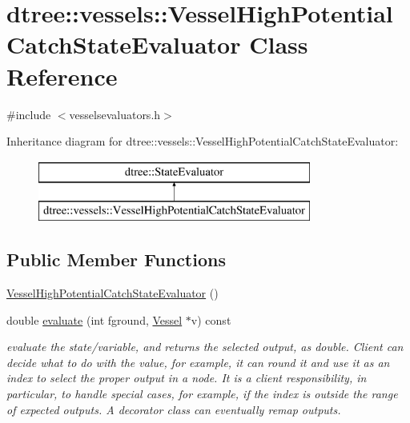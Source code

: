 \hypertarget{classdtree_1_1vessels_1_1_vessel_high_potential_catch_state_evaluator}{}\section{dtree\+::vessels\+::Vessel\+High\+Potential\+Catch\+State\+Evaluator Class Reference}
\label{classdtree_1_1vessels_1_1_vessel_high_potential_catch_state_evaluator}


{\ttfamily \#include $<$vesselsevaluators.\+h$>$}

Inheritance diagram for dtree\+::vessels\+::Vessel\+High\+Potential\+Catch\+State\+Evaluator\+:\begin{figure}[H]
\begin{center}
\leavevmode
\includegraphics[height=2.000000cm]{da/d41/classdtree_1_1vessels_1_1_vessel_high_potential_catch_state_evaluator}
\end{center}
\end{figure}
\subsection*{Public Member Functions}
\begin{DoxyCompactItemize}
\item 
\mbox{\hyperlink{classdtree_1_1vessels_1_1_vessel_high_potential_catch_state_evaluator_a78dd966f4bee0f041b0f927630e7bde7}{Vessel\+High\+Potential\+Catch\+State\+Evaluator}} ()
\item 
double \mbox{\hyperlink{classdtree_1_1vessels_1_1_vessel_high_potential_catch_state_evaluator_ad5031e7bb7fc276bd5ab0aa3965b7fb9}{evaluate}} (int fground, \mbox{\hyperlink{class_vessel}{Vessel}} $\ast$v) const
\begin{DoxyCompactList}\small\item\em evaluate the state/variable, and returns the selected output, as double. Client can decide what to do with the value, for example, it can round it and use it as an index to select the proper output in a node. It is a client responsibility, in particular, to handle special cases, for example, if the index is outside the range of expected outputs. A decorator class can eventually remap outputs. \end{DoxyCompactList}\end{DoxyCompactItemize}


